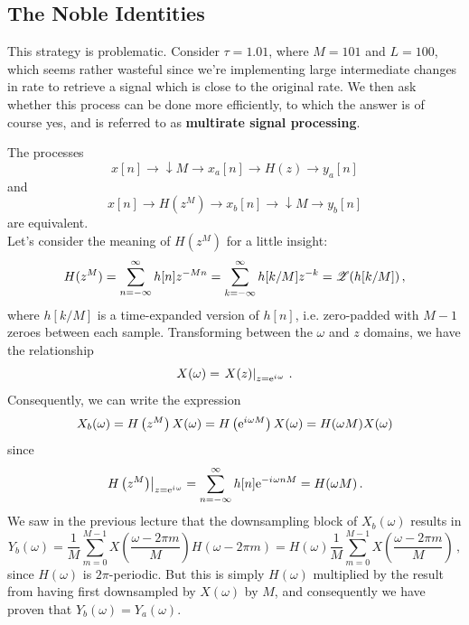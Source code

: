 \subsection{The Noble Identities}
%
This strategy is problematic. Consider $\tau = 1.01$, where $M = 101$ and
$L = 100$, which seems rather wasteful since we're implementing large intermediate
changes in rate to retrieve a signal which is close to the original rate. We then
ask whether this process can be done more efficiently, to which the answer is of
course yes, and is referred to as \textbf{multirate signal processing}.
%
\begin{iden}
  The processes
  \begin{displaymath}
    x[n] \longrightarrow \boxed{\downarrow M} \longrightarrow x_a[n]
    \longrightarrow \boxed{H(z)} \longrightarrow y_a[n]
  \end{displaymath}
  and
  \begin{displaymath}
    x[n] \longrightarrow \boxed{H\left(z^M\right)} \longrightarrow x_b[n]
    \longrightarrow \boxed{\downarrow M} \longrightarrow y_b[n]
  \end{displaymath}
  are equivalent.\\

  Let's consider the meaning of $H(z^M)$ for a little insight:
  \begin{displaymath}
    H(z^M) = \sum_{n=-\infty}^\infty h[n]z^{-Mn} = \sum_{k=-\infty}^\infty h[k/M] z^{-k}
    = \mathscr{Z}(h[k/M]) \,,
  \end{displaymath}
  where $h[k/M]$ is a time-expanded version of $h[n]$, i.e. zero-padded with
  $M-1$ zeroes between each sample. Transforming between the $\omega$ and $z$
  domains, we have the relationship
  \begin{displaymath}
    X(\omega) = \left. X(z) \right|_{z = \mathrm{e}^{{i\mkern1mu}\omega}} \,.
  \end{displaymath}
  Consequently, we can write the expression
  \begin{displaymath}
    X_b(\omega) = H\left(z^M\right)X(\omega) = H\left(\mathrm{e}^{{i\mkern1mu}\omega M}\right)X(\omega)
    = H(\omega M) X(\omega)
  \end{displaymath}
  since
  \begin{displaymath}
    \left.H\left(z^M\right)\right|_{z=\mathrm{e}^{{i\mkern1mu}\omega}}
    = \sum_{n=-\infty}^\infty h[n]\mathrm{e}^{-{i\mkern1mu}\omega nM} = H(\omega M) \,.
  \end{displaymath}
  We saw in the previous lecture that the downsampling block of $X_b(\omega)$ results in
  \begin{displaymath}
    Y_b(\omega) = \frac{1}{M}\sum_{m=0}^{M-1}X\left(\frac{\omega - 2\pi m}{M}\right)
    H(\omega - 2\pi m)
    = H(\omega)\frac{1}{M}\sum_{m=0}^{M-1} X\left(\frac{\omega - 2\pi m}{M}\right) \,,
  \end{displaymath}
  since $H(\omega)$ is $2\pi$-periodic. But this is simply $H(\omega)$ multiplied by
  the result from having first downsampled by $X(\omega)$ by $M$, and consequently we
  have proven that $Y_b(\omega) = Y_a(\omega)$.
\end{iden}
